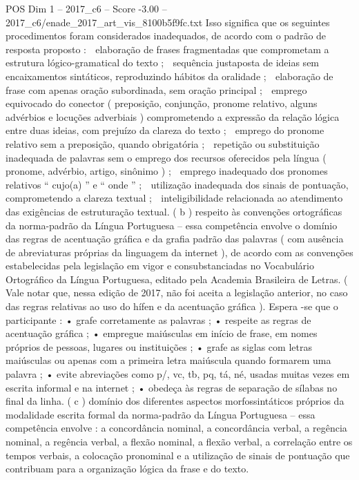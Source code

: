 \begin{textsample}{POS Dim 1 – 2017\_c6 – Score -3.00 – 2017\_c6/enade\_2017\_art\_vis\_8100b5f9fc.txt}
Isso significa que os seguintes procedimentos foram considerados inadequados, de acordo com o padrão de resposta proposto :  elaboração de frases fragmentadas que comprometam a estrutura lógico-gramatical do texto ;  sequência justaposta de ideias sem encaixamentos sintáticos, reproduzindo hábitos da oralidade ;  elaboração de frase com apenas oração subordinada, sem oração principal ;  emprego equivocado do conector ( preposição, conjunção, pronome relativo, alguns advérbios e locuções adverbiais ) comprometendo a expressão da relação lógica entre duas ideias, com prejuízo da clareza do texto ;  emprego do pronome relativo sem a preposição, quando obrigatória ;  repetição ou substituição inadequada de palavras sem o emprego dos recursos oferecidos pela língua ( pronome, advérbio, artigo, sinônimo ) ;  emprego inadequado dos pronomes relativos “ cujo(a) ” e “ onde ” ;  utilização inadequada dos sinais de pontuação, comprometendo a clareza textual ;  inteligibilidade relacionada ao atendimento das exigências de estruturação textual. ( b ) respeito às convenções ortográficas da norma-padrão da Língua Portuguesa – essa competência envolve o domínio das regras de acentuação gráfica e da grafia padrão das palavras ( com ausência de abreviaturas próprias da linguagem da internet ), de acordo com as convenções estabelecidas pela legislação em vigor e consubstanciadas no Vocabulário Ortográfico da Língua Portuguesa, editado pela Academia Brasileira de Letras. ( Vale notar que, nessa edição de 2017, não foi aceita a legislação anterior, no caso das regras relativas ao uso do hífen e da acentuação gráfica ).
Espera -se que o participante : • grafe corretamente as palavras ; • respeite as regras de acentuação gráfica ; • empregue maiúsculas em início de frase, em nomes próprios de pessoas, lugares ou instituições ; • grafe as siglas com letras maiúsculas ou apenas com a primeira letra maiúscula quando formarem uma palavra ; • evite abreviações como p/, vc, tb, pq, tá, né, usadas muitas vezes em escrita informal e na internet ; • obedeça às regras de separação de sílabas no final da linha. ( c ) domínio dos diferentes aspectos morfossintáticos próprios da modalidade escrita formal da norma-padrão da Língua Portuguesa – essa competência envolve : a concordância nominal, a concordância verbal, a regência nominal, a regência verbal, a flexão nominal, a flexão verbal, a correlação entre os tempos verbais, a colocação pronominal e a utilização de sinais de pontuação que contribuam para a organização lógica da frase e do texto.

\end{textsample}
